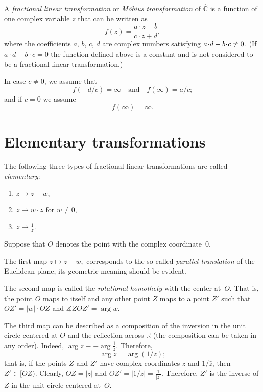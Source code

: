 A \emph{fractional linear transformation} or \emph{M\"obius transformation} of  $\hat{\mathbb{C}}$ is a function of one complex variable $z$
that can be written as
$$f(z) = \frac{a\cdot z + b}{c\cdot z + d},$$
where the coefficients $a$, $b$, $c$, $d$ are complex numbers satisfying $a\cdot d \z- b\cdot c \not= 0$.
(If $a\cdot d - b\cdot c = 0$ the function defined above is a constant and is not considered to be a fractional linear transformation.) 

In case $c\not=0$, we assume that
$$f(-d/c) = \infty
\quad
\text{and}
\quad
f(\infty) = a/c;$$
and if $c=0$ we assume
$$f(\infty) = \infty.$$





\section*{Elementary transformations}

The following three types of fractional linear transformations are called \emph{elementary}:
\begin{enumerate}
\item $z\mapsto z+w,$
\item $z\mapsto w\cdot z$ for $w\ne0,$
\item $z\mapsto \frac1z.$
\end{enumerate}
 
Suppose that $O$ denotes the point with the complex coordinate~$0$.

The first map $z\mapsto z+w,$ corresponds to the so-called 
\emph{parallel translation} 
of the Euclidean plane, its geometric meaning should be evident.

The second map is called the \emph{rotational homothety} with the center at~$O$.
That is, the point $O$ maps to itself
and any other point $Z$ maps to a point $Z'$ such that $OZ'=|w|\cdot OZ$ and $\measuredangle ZOZ'=\arg w$.

The third map can be described as a composition of the inversion in the unit circle centered at $O$ and the reflection across $\mathbb{R}$ 
(the composition can be taken in any order).
Indeed, $\arg z\equiv -\arg \tfrac1z$.
Therefore, 
$$\arg z=\arg (1/\bar z);$$
that is, if the points $Z$ and $Z'$ have complex coordinates $z$ and $1/\bar z$,
then $Z'\in[OZ)$.
Clearly, $OZ=|z|$ and $OZ'=|1/\bar z|=\tfrac{1}{|z|}$.
Therefore, $Z'$ is the inverse of $Z$ in the unit circle centered at~$O$.

